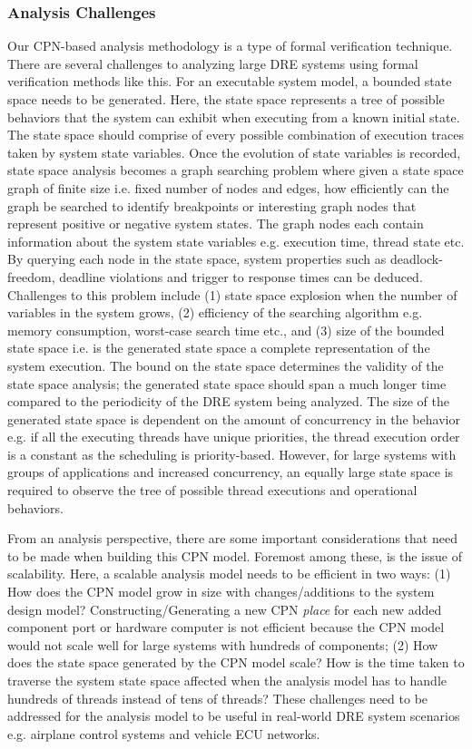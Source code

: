 \subsubsection{Analysis Challenges}

Our CPN-based analysis methodology is a type of formal verification technique. There are several challenges to analyzing large DRE systems using formal verification methods like this. For an executable system model, a bounded state space needs to be generated. Here, the state space represents a tree of possible behaviors that the system can exhibit when executing from a known initial state. The state space should comprise of every possible combination of execution traces taken by system state variables. Once the evolution of state variables is recorded, state space analysis becomes a graph searching problem where given a state space graph of finite size i.e. fixed number of nodes and edges, how efficiently can the graph be searched to identify breakpoints or interesting graph nodes that represent positive or negative system states. The graph nodes each contain information about the system state variables e.g. execution time, thread state etc. By querying each node in the state space, system properties such as deadlock-freedom, deadline violations and trigger to response times can be deduced. Challenges to this problem include (1) state space explosion when the number of variables in the system grows, (2) efficiency of the searching algorithm e.g. memory consumption, worst-case search time etc., and (3) size of the bounded state space i.e. is the generated state space a complete representation of the system execution. The bound on the state space determines the validity of the state space analysis; the generated state space should span a much longer time compared to the periodicity of the DRE system being analyzed. The size of the generated state space is dependent on the amount of concurrency in the behavior e.g. if all the executing threads have unique priorities, the thread execution order is a constant as the scheduling is priority-based. However, for large systems with groups of applications and increased concurrency, an equally large state space is required to observe the tree of possible thread executions and operational behaviors.

From an analysis perspective, there are some important considerations that need to be made when building this CPN model. Foremost among these, is the issue of scalability. Here, a scalable analysis model needs to be efficient in two ways: (1) How does the CPN model grow in size with changes/additions to the system design model? Constructing/Generating a new CPN \emph{place} for each new added component port or hardware computer is not efficient because the CPN model would not scale well for large systems with hundreds of components; (2) How does the state space generated by the CPN model scale? How is the time taken to traverse the system state space affected when the analysis model has to handle hundreds of threads instead of tens of threads? These challenges need to be addressed for the analysis model to be useful in real-world DRE system scenarios e.g. airplane control systems and vehicle ECU networks.

